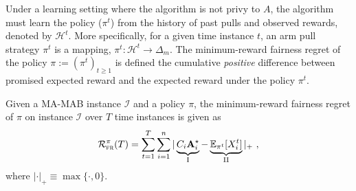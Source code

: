 


    Under a learning setting where  the algorithm is not privy to $A$,  the algorithm must learn the policy ($\pi^t$) from the history of past pulls  and observed rewards, denoted by $\mathcal{H}^t$. More specifically,  for a given time instance $t$,  an arm pull strategy $\pi^t$ is a mapping,  $\pi^t: \mathcal{H}^t \rightarrow \Delta_{m}$.  The minimum-reward fairness regret of the policy $\pi:= (\pi^t)_{t\geq 1}$ is defined  the cumulative \emph{positive} difference between promised expected reward and the expected reward under the policy $\pi^t$.   

\iffalse 
The objective is to maximize the expected social welfare subject to fairness guarantee. \begin{align}
    \max_{\pi \in \Delta([k])}  & \sum_{ i\in [n]} \langle A_i, \pi \rangle \nonumber \\ 
    \text{subject to} & \nonumber \\ 
    A\pi &\geq C \cdot  \Amax \label{opt_problem}
\end{align}
Here, $C$ is a diagonal matrix with $C_{i,i} = C_i \leq \frac{1}{\min(n,k)}$. 
\fi 


\begin{definition}
Given a MA-MAB instance $\mathcal{I}$ and a policy $\pi$, the minimum-reward fairness regret of $\pi$ on instance $\mathcal{I}$ over $T$ time instances is given as  
\begin{equation}
\mathcal{R}_{\textsc{fr}}^\pi(T) = \sum_{t=1}^T \sum_{i=1}^n | 
\underbrace{C_i \mathbf{A}^{\star}_i}_{\text{I}} - \underbrace{\mathbb{E}_{\pi^t} [X_i^t]}_{\text{II}} |_+ \ ,
\end{equation}
where \( |\cdot|_+ \equiv \max\{\cdot, 0\} \).
\end{definition}


